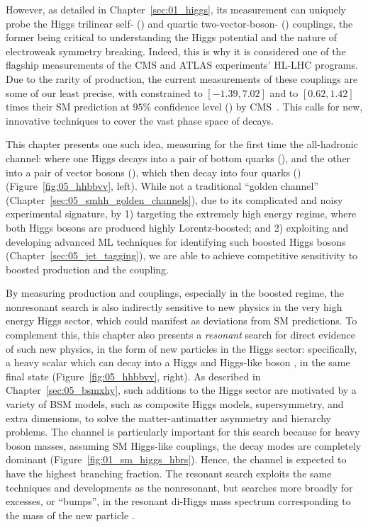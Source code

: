 However, as detailed in Chapter~\ref{sec:01_higgs}, its measurement can uniquely probe the Higgs trilinear self- (\cl) and quartic two-vector-boson- (\cvv) couplings, the former being critical to understanding the Higgs potential and the nature of electroweak symmetry breaking.
Indeed, this is why it is considered one of the flagship measurements of the CMS and ATLAS experiments' HL-LHC programs.
Due to the rarity of \HH production, the current measurements of these couplings are some of our least precise, with \cl constrained to $[-1.39, 7.02]$ and \cvv to $[0.62, 1.42]$ times their SM prediction at $95\%$ confidence level (\CL) by CMS~\cite{CMS-PAS-HIG-20-011}.
This calls for new, innovative techniques to cover the vast phase space of \HH decays.

This chapter presents one such idea, measuring for the first time the all-hadronic \HHbbVV channel: where one Higgs decays into a pair of bottom quarks (\bbbar), and the other into a pair of vector bosons (\VV), which then decay into four quarks (\qqqq) (Figure~\ref{fig:05_hhbbvv}, left).
While not a traditional ``golden channel'' (Chapter~\ref{sec:05_smhh_golden_channels}), due to its complicated and noisy experimental signature, by 1) targeting the extremely high energy \HH regime, where both Higgs bosons are produced highly Lorentz-boosted; and 2) exploiting and developing advanced ML techniques for identifying such boosted Higgs bosons (Chapter~\ref{sec:05_jet_tagging}), we are able to achieve competitive sensitivity to boosted \HH production and the \cvv coupling.

By measuring \HH production and couplings, especially in the boosted regime, the nonresonant search is also indirectly sensitive to new physics in the very high energy Higgs sector, which could manifest as deviations from SM predictions.
To complement this, this chapter also presents a \textit{resonant} search for direct evidence of such new physics, in the form of new particles in the Higgs sector: specifically, a heavy scalar \PX which can decay into a Higgs and Higgs-like boson \PY, in the same final state (Figure~\ref{fig:05_hhbbvv}, right). 
As described in Chapter~\ref{sec:05_bsmxhy}, such additions to the Higgs sector are motivated by a variety of BSM models, such as composite Higgs models, supersymmetry, and extra dimensions, to solve the matter-antimatter asymmetry and hierarchy problems.
The \bbvv channel is particularly important for this search because for heavy \PY boson masses, assuming SM Higgs-like couplings, the \yvv decay modes are completely dominant (Figure~\ref{fig:01_sm_higgs_hbrs}).
Hence, the \bbvv channel is expected to have the highest branching fraction. 
The resonant search exploits the same techniques and developments as the nonresonant, but searches more broadly for excesses, or ``bumps'', in the resonant di-Higgs mass spectrum corresponding to the mass of the new particle \PX.

